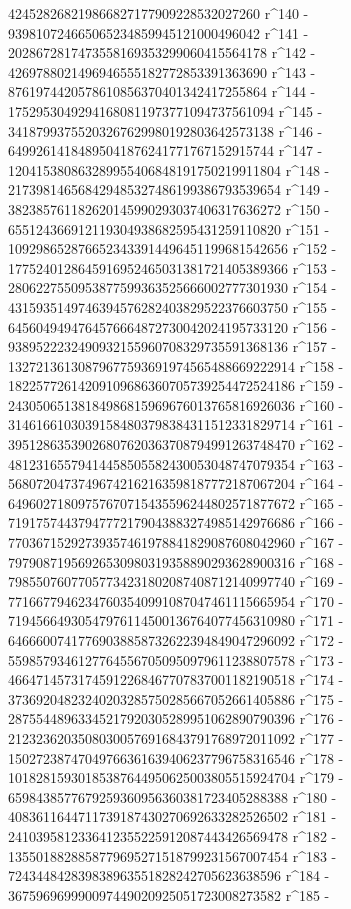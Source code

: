        424528268219866827177909228532027260 r^140 - 
       939810724665065234859945121000496042 r^141 - 
       2028672817473558169353299060415564178 r^142 - 
       4269788021496946555182772853391363690 r^143 - 
       8761974420578610856370401342417255864 r^144 - 
       17529530492941680811973771094737561094 r^145 - 
       34187993755203267629980192803642573138 r^146 - 
       64992614184895041876241771767152915744 r^147 - 
       120415380863289955406848191750219911804 r^148 - 
       217398146568429485327486199386793539654 r^149 - 
       382385761182620145990293037406317636272 r^150 - 
       655124366912119304938682595431259110820 r^151 - 
       1092986528766523433914496451199681542656 r^152 - 
       1775240128645916952465031381721405389366 r^153 - 
       2806227550953877599363525666002777301930 r^154 - 
       4315935149746394576282403829522376603750 r^155 - 
       6456049494764576664872730042024195733120 r^156 - 
       9389522232490932155960708329735591368136 r^157 - 
       13272136130879677593691974565488669222914 r^158 - 
       18225772614209109686360705739254472524186 r^159 - 
       24305065138184986815969676013765816926036 r^160 - 
       31461661030391584803798384311512331829714 r^161 - 
       39512863539026807620363708794991263748470 r^162 - 
       48123165579414458505582430053048747079354 r^163 - 
       56807204737496742162163598187772187067204 r^164 - 
       64960271809757670715435596244802571877672 r^165 - 
       71917574437947772179043883274985142976686 r^166 - 
       77036715292739357461978841829087608042960 r^167 - 
       79790871956926530980319358890293628900316 r^168 - 
       79855076077057734231802087408712140997740 r^169 - 
       77166779462347603540991087047461115665954 r^170 - 
       71945664930547976114500136764077456310980 r^171 - 
       64666007417769038858732622394849047296092 r^172 - 
       55985793461277645567050950979611238807578 r^173 - 
       46647145731745912268467707837001182190518 r^174 - 
       37369204823240203285750285667052661405886 r^175 - 
       28755448963345217920305289951062890790396 r^176 - 
       21232362035080300576916843791768972011092 r^177 - 
       15027238747049766361639406237796758316546 r^178 - 
       10182815930185387644950625003805515924704 r^179 - 
       6598438577679259360956360381723405288388 r^180 - 
       4083611644711739187430270692633282526502 r^181 - 
       2410395812336412355225912087443426569478 r^182 - 
       1355018828858779695271518799231567007454 r^183 - 
       724344842839838963551828242705623638596 r^184 - 
       367596969990097449020925051723008273582 r^185 - 
